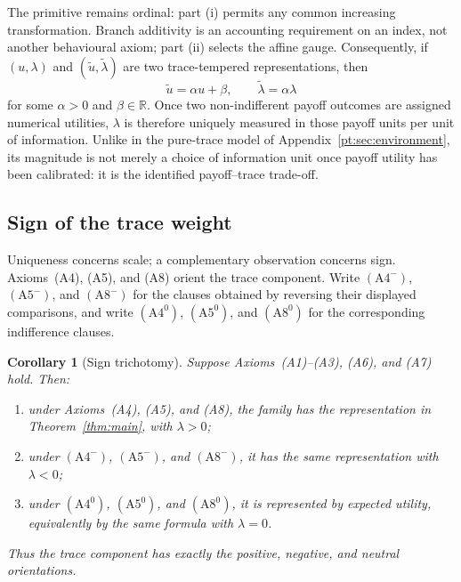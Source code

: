 \documentclass[11pt,a4paper]{article}
\newtheorem{corollary}[theorem]{Corollary}
\theoremstyle{definition}
\newcommand{\1}{\mathbf 1}
\begin{document}
The primitive remains ordinal: part \textup{(i)} permits any common increasing transformation.  Branch additivity is
an accounting requirement on an index, not another behavioural axiom; part \textup{(ii)} selects the affine gauge.
Consequently, if $(u,\lambda)$ and $(\widetilde u,\widetilde\lambda)$ are two trace-tempered representations, then
\[
 \widetilde u=\alpha u+\beta,
 \qquad
 \widetilde\lambda=\alpha\lambda
\]
for some $\alpha>0$ and $\beta\in\mathbb R$.  Once two non-indifferent payoff outcomes are assigned numerical utilities, $\lambda$ is
therefore uniquely measured in those payoff units per unit of information.  Unlike in the pure-trace model of
Appendix~\ref{pt:sec:environment}, its magnitude is not merely a choice of information unit once payoff utility
has been calibrated: it is the identified payoff--trace trade-off.

\subsection{Sign of the trace weight}

Uniqueness concerns scale; a complementary observation concerns sign.  Axioms~\textup{(A4)}, \textup{(A5)}, and
\textup{(A8)} orient the trace component.  Write $(\mathrm{A}4^-)$, $(\mathrm{A}5^-)$, and $(\mathrm{A}8^-)$ for
the clauses obtained by reversing their displayed comparisons, and write $(\mathrm{A}4^0)$,
$(\mathrm{A}5^0)$, and $(\mathrm{A}8^0)$ for the corresponding indifference clauses.

\begin{corollary}[Sign trichotomy]\label{cor:signduality}
Suppose Axioms~\textup{(A1)--(A3)}, \textup{(A6)}, and \textup{(A7)} hold.  Then:
\begin{enumerate}[label=\textup{(\roman*)},leftmargin=*]
\item under Axioms~\textup{(A4)}, \textup{(A5)}, and \textup{(A8)}, the family has the representation in
Theorem~\ref{thm:main}, with $\lambda>0$;
\item under $(\mathrm{A}4^-)$, $(\mathrm{A}5^-)$, and $(\mathrm{A}8^-)$, it has the same representation with
$\lambda<0$;
\item under $(\mathrm{A}4^0)$, $(\mathrm{A}5^0)$, and $(\mathrm{A}8^0)$, it is represented by expected utility,
equivalently by the same formula with $\lambda=0$.
\end{enumerate}
Thus the trace component has exactly the positive, negative, and neutral orientations.
\end{corollary}
\end{document}
